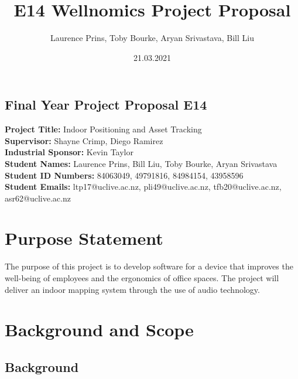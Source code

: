 \documentclass[9pt, a4paper]{report}
\title{E14 Wellnomics Project Proposal}
\author{Laurence Prins, Toby Bourke,  Aryan Srivastava,  Bill Liu}
\date{21.03.2021}
\begin{document}
	\begin{center}
		\section*{\Huge Final Year Project Proposal E14}
	\end{center}
	
	\vspace{60pt} \hfill {}
	
	\noindent\textbf{Project Title:} Indoor Positioning and Asset Tracking\\
	
	\noindent\textbf{Supervisor:} Shayne Crimp, Diego Ramirez\\
	
	\noindent\textbf{Industrial Sponsor:} Kevin Taylor\\
	
	\noindent\textbf{Student Names:} Laurence Prins, Bill Liu, Toby Bourke, Aryan Srivastava\\
	
	\noindent\textbf{Student ID Numbers:} 84063049, 49791816, 84984154, 43958596\\
	
	\noindent\textbf{Student Emails:} ltp17@uclive.ac.nz, pli49@uclive.ac.nz, tfb20@uclive.ac.nz, asr62@uclive.ac.nz\\
	
	\pagebreak
	
	\maketitle
	
	\section*{Purpose Statement}
	The purpose of this project is to develop software for a device that improves the well-being of
employees and the ergonomics of office spaces. The project will deliver an indoor mapping system
through the use of audio technology.
	\section*{Background and Scope}
	\subsection*{Background}
	
\end{document}

